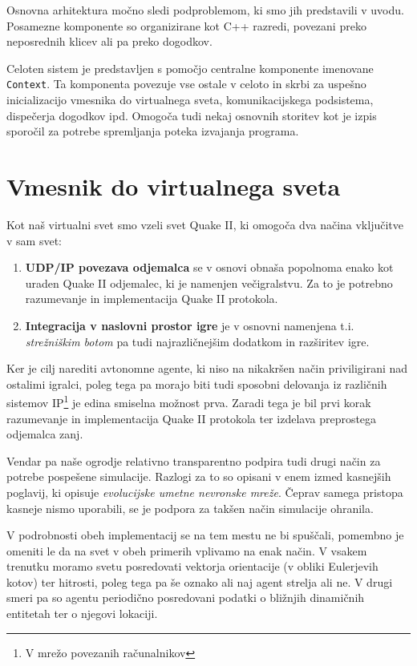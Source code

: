\documentclass[a4paper,10pt]{article}
\begin{document}
Osnovna arhitektura močno sledi podproblemom, ki smo jih predstavili v uvodu. Posamezne komponente so organizirane kot C++ razredi, povezani preko neposrednih klicev ali pa preko dogodkov.

Celoten sistem je predstavljen s pomočjo centralne komponente imenovane \texttt{Context}. Ta komponenta povezuje vse ostale v celoto in skrbi za uspešno inicializacijo vmesnika do virtualnega sveta, komunikacijskega podsistema, dispečerja dogodkov ipd. Omogoča tudi nekaj osnovnih storitev kot je izpis sporočil za potrebe spremljanja poteka izvajanja programa.

\section{Vmesnik do virtualnega sveta}

Kot naš virtualni svet smo vzeli svet Quake II, ki omogoča dva načina vključitve v sam svet:
\begin{enumerate}
  \item \textbf{UDP/IP povezava odjemalca} se v osnovi obnaša popolnoma enako kot uraden Quake II odjemalec, ki je namenjen večigralstvu. Za to je potrebno razumevanje in implementacija Quake II protokola.
  
  \item \textbf{Integracija v naslovni prostor igre} je v osnovni namenjena t.i. \textit{strežniškim botom} pa tudi najrazličnejšim dodatkom in razširitev igre.
\end{enumerate}

Ker je cilj narediti avtonomne agente, ki niso na nikakršen način priviligirani nad ostalimi igralci, poleg tega pa morajo biti tudi sposobni delovanja iz različnih sistemov IP\footnote{V mrežo povezanih računalnikov} je edina smiselna možnost prva. Zaradi tega je bil prvi korak razumevanje in implementacija Quake II protokola ter izdelava preprostega odjemalca zanj.

Vendar pa naše ogrodje relativno transparentno podpira tudi drugi način za potrebe pospešene simulacije. Razlogi za to so opisani v enem izmed kasnejših poglavij, ki opisuje \textit{evolucijske umetne nevronske mreže}. Čeprav samega pristopa kasneje nismo uporabili, se je podpora za takšen način simulacije ohranila.

V podrobnosti obeh implementacij se na tem mestu ne  bi spuščali, pomembno je omeniti le da na svet v obeh primerih vplivamo na enak način. V vsakem trenutku moramo svetu posredovati vektorja orientacije (v obliki Eulerjevih kotov) ter hitrosti, poleg tega pa še oznako ali naj agent strelja ali ne. V drugi smeri pa so agentu periodično posredovani podatki o bližnjih dinamičnih entitetah ter o njegovi lokaciji.
\end{document}
